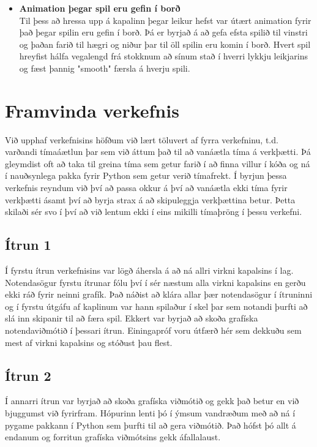 \documentclass[11pt,a4paper,titlepage]{article}
\theoremstyle{plain}
\theoremstyle{remark}
\begin{document}
\begin{itemize}
\item {\bf Animation þegar spil eru gefin í borð} \\
Til þess að hressa upp á kapalinn þegar leikur hefst var útært animation fyrir það þegar spilin eru gefin í borð. Þá er byrjað á að gefa efsta spilið til vinstri og þaðan farið til hægri og niður þar til öll spilin eru komin í borð. Hvert spil hreyfist hálfa vegalengd frá stokknum að sínum stað í hverri lykkju leikjarins og fæst þannig "smooth" færsla á hverju spili.

\end{itemize}


\section{Framvinda verkefnis}

Við upphaf verkefnisins höfðum við lært töluvert af fyrra verkefninu, t.d. varðandi tímaáætlun þar sem við áttum það til að vanáætla tíma á verkþætti. Þá gleymdist oft að taka til greina tíma sem getur farið í að finna villur í kóða og ná í nauðsynlega pakka fyrir Python sem getur verið tímafrekt. Í byrjun þessa verkefnis reyndum við því að passa okkur á því að vanáætla ekki tíma fyrir verkþætti ásamt því að byrja strax á að skipuleggja verkþættina betur. Þetta skilaði sér svo í því að við lentum ekki í eins mikilli tímaþröng í þessu verkefni.

\subsection*{Ítrun 1}
Í fyrstu ítrun verkefnisins var lögð áhersla á að ná allri virkni kapalsins í lag. Notendasögur fyrstu ítrunar fólu því í sér næstum alla virkni kapalsins en gerðu ekki ráð fyrir neinni grafík. Það náðist að klára allar þær notendasögur í ítruninni og í fyrstu útgáfu af kaplinum var hann spilaður í skel þar sem notandi þurfti að slá inn skipanir til að færa spil. Ekkert var byrjað að skoða grafíska notendaviðmótið í þessari ítrun. Einingapróf voru útfærð hér sem dekkuðu sem mest af virkni kapalsins og stóðust þau flest.

\subsection*{Ítrun 2}

Í annarri ítrun var byrjað að skoða grafíska viðmótið og gekk það betur en við bjuggumst við fyrirfram. Hópurinn lenti þó í ýmsum vandræðum með að ná í pygame pakkann í Python sem þurfti til að gera viðmótið. Það hófst þó allt á endanum og forritun grafíska viðmótsins gekk áfallalaust.
\end{document}

